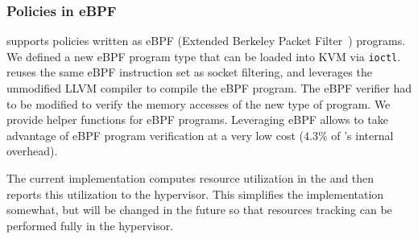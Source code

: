 \subsubsection{Policies in eBPF}
\label{s:bpf}

\AvA supports policies written as eBPF (Extended Berkeley Packet Filter~\cite{bpf}) programs.
We defined a new eBPF program type
that can be loaded into KVM via \lstinline|ioctl|.
\AvA reuses the same eBPF instruction set as socket filtering,
and leverages the unmodified LLVM compiler to compile the eBPF program.
The eBPF verifier had to be modified to verify the memory accesses of the new type of program.
We provide helper functions for \AvA eBPF programs.
Leveraging eBPF allows \AvA to take advantage of eBPF program verification at a very low cost (4.3\% of \AvA's internal overhead).

The current implementation computes resource utilization in the \worker and then reports this utilization to the hypervisor.
This simplifies the implementation somewhat, but will be changed in the future so that resources tracking can be performed fully in the hypervisor.

